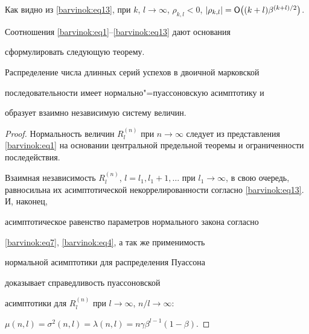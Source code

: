 Как видно из \eqref{barvinok:eq13}, при $k$, $l\to \infty$, $\rho

_{k,l} <0$, $|\rho _{k,l}|= {\sf O} \bigl( (k+l) \beta ^{({k+l})/{2}} \bigr)$.



Соотношения \eqref{barvinok:eq1}--\eqref{barvinok:eq13} дают основания

сформулировать следующую теорему.



\smallskip



\begin{theorem}[1]Распределение числа длинных серий успехов в двоичной марковской

последовательности имеет нормально"=пуассоновскую асимптотику и

образует взаимно независимую систему величин.

\end{theorem}



\smallskip



\begin{proof}

Нормальность величин  $R_l^{(n)} $ при $n\to \infty $ следует из представления \eqref{barvinok:eq1} на основании центральной предельной теоремы и ограниченности последействия. 

Взаимная независимость $R_l^{(n)}$, $l=l_1, l_1 +1, \ldots$ при $l_1 \to \infty $, в свою очередь, равносильна их асимптотической некоррелированности согласно \eqref{barvinok:eq13}. И, наконец,

асимптотическое равенство параметров нормального закона согласно

\eqref{barvinok:eq7}, \eqref{barvinok:eq4}, а так же применимость

нормальной асимптотики для распределения Пуассона

\cite{barvinok:bib5} доказывает справедливость пуассоновской

асимптотики для $R_l^{(n)}$ при $l\to \infty$, $n/l \to \infty $:

$\mu (n,l)=\sigma^2 (n,l) = \lambda (n,l) = n\gamma \beta ^{l-1} (

1-\beta)$.

\end{proof}



\smallskip



